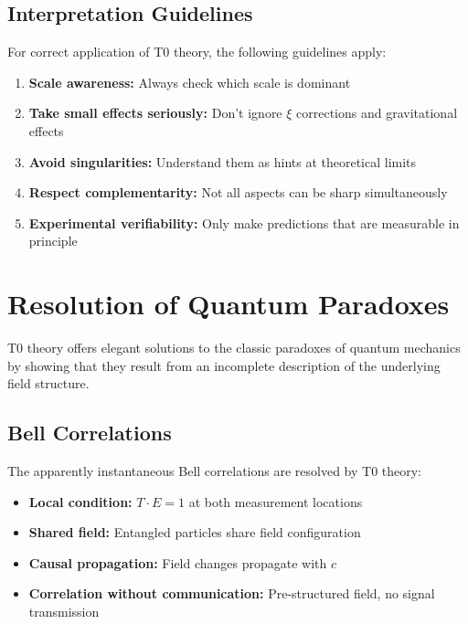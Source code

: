 	\subsection{Interpretation Guidelines}
	
	For correct application of T0 theory, the following guidelines apply:
	
	\begin{enumerate}
		\item \textbf{Scale awareness:} Always check which scale is dominant
		\item \textbf{Take small effects seriously:} Don't ignore $\xi$ corrections and gravitational effects
		\item \textbf{Avoid singularities:} Understand them as hints at theoretical limits
		\item \textbf{Respect complementarity:} Not all aspects can be sharp simultaneously
		\item \textbf{Experimental verifiability:} Only make predictions that are measurable in principle
	\end{enumerate}
	
	\section{Resolution of Quantum Paradoxes}
	
	T0 theory offers elegant solutions to the classic paradoxes of quantum mechanics by showing that they result from an incomplete description of the underlying field structure.
	
	\subsection{Bell Correlations}
	
	The apparently instantaneous Bell correlations are resolved by T0 theory:
	
	\begin{itemize}
		\item \textbf{Local condition:} $T \cdot E = 1$ at both measurement locations
		\item \textbf{Shared field:} Entangled particles share field configuration
		\item \textbf{Causal propagation:} Field changes propagate with $c$
		\item \textbf{Correlation without communication:} Pre-structured field, no signal transmission
	\end{itemize}
	
